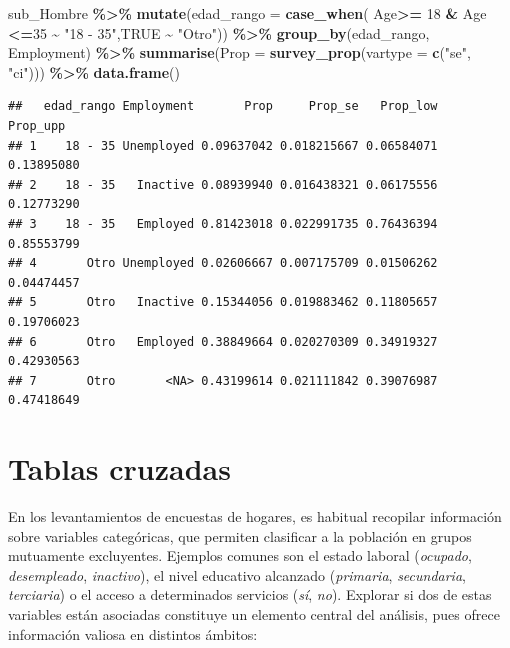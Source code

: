 \documentclass[
  spanish,
  12pt,
]{book}
\newenvironment{Shaded}{\begin{snugshade}}{\end{snugshade}}
\newcommand{\AttributeTok}[1]{\textcolor[rgb]{0.13,0.29,0.53}{#1}}
\newcommand{\ConstantTok}[1]{\textcolor[rgb]{0.56,0.35,0.01}{#1}}
\newcommand{\DecValTok}[1]{\textcolor[rgb]{0.00,0.00,0.81}{#1}}
\newcommand{\FunctionTok}[1]{\textcolor[rgb]{0.13,0.29,0.53}{\textbf{#1}}}
\newcommand{\NormalTok}[1]{#1}
\newcommand{\SpecialCharTok}[1]{\textcolor[rgb]{0.81,0.36,0.00}{\textbf{#1}}}
\newcommand{\StringTok}[1]{\textcolor[rgb]{0.31,0.60,0.02}{#1}}
\begin{document}
\begin{Shaded}
\begin{Highlighting}[]
\NormalTok{sub\_Hombre }\SpecialCharTok{\%\textgreater{}\%} \FunctionTok{mutate}\NormalTok{(}\AttributeTok{edad\_rango =} \FunctionTok{case\_when}\NormalTok{(}
\NormalTok{                      Age}\SpecialCharTok{\textgreater{}=} \DecValTok{18} \SpecialCharTok{\&}\NormalTok{ Age }\SpecialCharTok{\textless{}=}\DecValTok{35}  \SpecialCharTok{\textasciitilde{}} \StringTok{"18 {-} 35"}\NormalTok{,}\ConstantTok{TRUE} \SpecialCharTok{\textasciitilde{}} \StringTok{"Otro"}\NormalTok{)) }\SpecialCharTok{\%\textgreater{}\%}
                      \FunctionTok{group\_by}\NormalTok{(edad\_rango, Employment) }\SpecialCharTok{\%\textgreater{}\%} 
                      \FunctionTok{summarise}\NormalTok{(}\AttributeTok{Prop =} \FunctionTok{survey\_prop}\NormalTok{(}\AttributeTok{vartype =}  \FunctionTok{c}\NormalTok{(}\StringTok{"se"}\NormalTok{, }\StringTok{"ci"}\NormalTok{))) }\SpecialCharTok{\%\textgreater{}\%} 
                      \FunctionTok{data.frame}\NormalTok{()}
\end{Highlighting}
\end{Shaded}

\begin{verbatim}
##   edad_rango Employment       Prop     Prop_se   Prop_low   Prop_upp
## 1    18 - 35 Unemployed 0.09637042 0.018215667 0.06584071 0.13895080
## 2    18 - 35   Inactive 0.08939940 0.016438321 0.06175556 0.12773290
## 3    18 - 35   Employed 0.81423018 0.022991735 0.76436394 0.85553799
## 4       Otro Unemployed 0.02606667 0.007175709 0.01506262 0.04474457
## 5       Otro   Inactive 0.15344056 0.019883462 0.11805657 0.19706023
## 6       Otro   Employed 0.38849664 0.020270309 0.34919327 0.42930563
## 7       Otro       <NA> 0.43199614 0.021111842 0.39076987 0.47418649
\end{verbatim}

\section{Tablas cruzadas}\label{tablas-cruzadas}

En los levantamientos de encuestas de hogares, es habitual recopilar información sobre variables categóricas, que permiten clasificar a la población en grupos mutuamente excluyentes. Ejemplos comunes son el estado laboral (\emph{ocupado}, \emph{desempleado}, \emph{inactivo}), el nivel educativo alcanzado (\emph{primaria}, \emph{secundaria}, \emph{terciaria}) o el acceso a determinados servicios (\emph{sí}, \emph{no}). Explorar si dos de estas variables están asociadas constituye un elemento central del análisis, pues ofrece información valiosa en distintos ámbitos:
\end{document}
